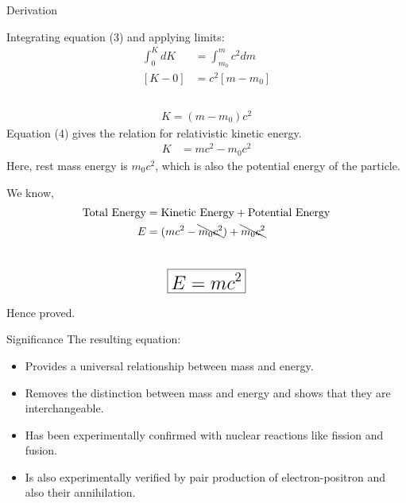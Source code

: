 \documentclass[11pt]{beamer}
\begin{document}
\begin{frame}[t,allowframebreaks]{Derivation}
        \framebreak

        Integrating equation (3) and applying limits:
        \begin{align*}
            \int_{0}^{K} dK &= \int_{m_0}^{m} c^2 dm\\[5pt]
            [K - 0] &= c^2 [m - m_0]\\
        \end{align*}~\\[-50pt]
        \begin{align}
            \boxed{K = (m - m_0) c^2}
        \end{align}
        Equation (4) gives the relation for relativistic kinetic energy.
        \begin{align*}
            K &= mc^2 - m_0 c^2
        \end{align*}
        Here, rest mass energy is $m_0 c^2$, which is also the potential energy of the particle.

        \framebreak

        We know,\\[-20pt]
        \begin{align*}
            \text{Total Energy} &= \text{Kinetic Energy} + \text{Potential Energy}\\
            E & = (mc^2 - \bcancel{m_0 c^2}) + \bcancel{m_0 c^2}\\
        \end{align*}~\\[-40pt]
        \begin{align*}
            \LARGE\boxed{E = mc^2}
        \end{align*}
        \begin{center}
            Hence proved.
        \end{center}
    \end{frame}

    \begin{frame}[t]{Significance}
        The resulting equation:\\[10pt]
        \begin{itemize}
            \item Provides a universal relationship between mass and energy.
            \item Removes the distinction between mass and energy and shows that they are interchangeable.
            \item Has been experimentally confirmed with nuclear reactions like fission and fusion.
            \item Is also experimentally verified by pair production of electron-positron and also their
            annihilation.
        \end{itemize}
    \end{frame}
\end{document}
